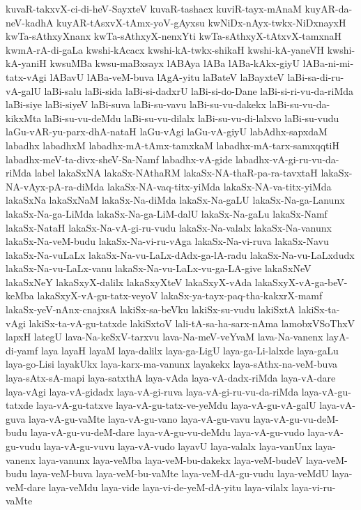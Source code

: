 {kuvaR-takxvX-ci-di-heV-SayxteV
kuvaR-tashacx
kuviR-tayx-mAnaM
kuyAR-da-neV-kadhA
kuyAR-tAsxvX-tAmx-yoV-gAyxsu
kwNiDx-nAyx-twkx-NiDxnayxH
kwTa-sAthxyXnanx
kwTa-sAthxyX-nenxYti
kwTa-sAthxyX-tAtxvX-tamxnaH
kwmA-rA-di-gaLa
kwshi-kAcacx
kwshi-kA-twkx-shikaH
kwshi-kA-yaneVH
kwshi-kA-yaniH
kwsuMBa
kwsu-maBxsayx
lABAya
lABa
lABa-kAkx-giyU
lABa-ni-mi-tatx-vAgi
lABavU
lABa-veM-buva
lAgA-yitu
laBateV
laBayxteV
laBi-sa-di-ru-vA-galU
laBi-salu
laBi-sida
laBi-si-dadxrU
laBi-si-do-Dane
laBi-si-ri-vu-da-riMda
laBi-siye
laBi-siyeV
laBi-suva
laBi-su-vavu
laBi-su-vu-dakekx
laBi-su-vu-da-kikxMta
laBi-su-vu-deMdu
laBi-su-vu-dilalx
laBi-su-vu-di-lalxvo
laBi-su-vudu
laGu-vAR-yu-parx-dhA-nataH
laGu-vAgi
laGu-vA-giyU
labAdhx-sapxdaM
labadhx
labadhxM
labadhx-mA-tAmx-tamxkaM
labadhx-mA-tarx-samxqqtiH
labadhx-meV-ta-divx-sheV-Sa-Namf
labadhx-vA-gide
labadhx-vA-gi-ru-vu-da-riMda
label
lakaSxNA
lakaSx-NAthaRM
lakaSx-NA-thaR-pa-ra-tavxtaH
lakaSx-NA-vAyx-pA-ra-diMda
lakaSx-NA-vaq-titx-yiMda
lakaSx-NA-va-titx-yiMda
lakaSxNa
lakaSxNaM
lakaSx-Na-diMda
lakaSx-Na-gaLU
lakaSx-Na-ga-Lanunx
lakaSx-Na-ga-LiMda
lakaSx-Na-ga-LiM-dalU
lakaSx-Na-gaLu
lakaSx-Namf
lakaSx-NataH
lakaSx-Na-vA-gi-ru-vudu
lakaSx-Na-valalx
lakaSx-Na-vanunx
lakaSx-Na-veM-budu
lakaSx-Na-vi-ru-vAga
lakaSx-Na-vi-ruva
lakaSx-Navu
lakaSx-Na-vuLaLx
lakaSx-Na-vu-LaLx-dAdx-ga-lA-radu
lakaSx-Na-vu-LaLxdudx
lakaSx-Na-vu-LaLx-vanu
lakaSx-Na-vu-LaLx-vu-ga-LA-give
lakaSxNeV
lakaSxNeY
lakaSxyX-dalilx
lakaSxyXteV
lakaSxyX-vAda
lakaSxyX-vA-ga-beV-keMba
lakaSxyX-vA-gu-tatx-veyoV
lakaSx-ya-tayx-paq-tha-kakxrX-mamf
lakaSx-yeV-nAnx-cnajxsA
lakiSx-sa-beVku
lakiSx-su-vudu
lakiSxtA
lakiSx-ta-vAgi
lakiSx-ta-vA-gu-tatxde
lakiSxtoV
lali-tA-sa-ha-sarx-nAma
lamobxVSoThxV
lapxH
lategU
lava-Na-keSxV-tarxvu
lava-Na-meV-veYvaM
lava-Na-vanenx
layA-di-yamf
laya
layaH
layaM
laya-dalilx
laya-ga-LigU
laya-ga-Li-lalxde
laya-gaLu
laya-go-Lisi
layakUkx
laya-karx-ma-vanunx
layakekx
laya-sAthx-na-veM-buva
laya-sAtx-sA-mapi
laya-satxthA
laya-vAda
laya-vA-dadx-riMda
laya-vA-dare
laya-vAgi
laya-vA-gidadx
laya-vA-gi-ruva
laya-vA-gi-ru-vu-da-riMda
laya-vA-gu-tatxde
laya-vA-gu-tatxve
laya-vA-gu-tatx-ve-yeMdu
laya-vA-gu-vA-galU
laya-vA-guva
laya-vA-gu-vaMte
laya-vA-gu-vano
laya-vA-gu-vavu
laya-vA-gu-vu-deM-budu
laya-vA-gu-vu-deM-dare
laya-vA-gu-vu-deMdu
laya-vA-gu-vudo
laya-vA-gu-vudu
laya-vA-gu-vuvu
laya-vA-vudo
layavU
laya-valalx
laya-vanUnx
laya-vanenx
laya-vanunx
laya-veMba
laya-veM-bu-dakekx
laya-veM-budeV
laya-veM-budu
laya-veM-buva
laya-veM-bu-vaMte
laya-veM-dA-gu-vudu
laya-veMdU
laya-veM-dare
laya-veMdu
laya-vide
laya-vi-de-yeM-dA-yitu
laya-vilalx
laya-vi-ru-vaMte
}
